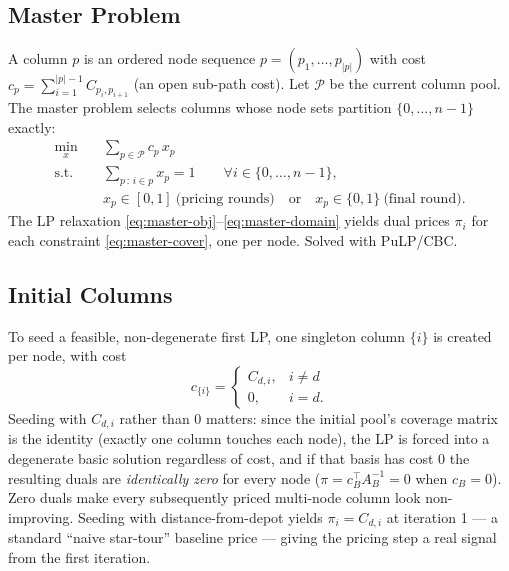 \documentclass[11pt]{article}
\begin{document}
\subsection{Master Problem}
\label{sec:cg-master}

A column $p$ is an ordered node sequence $p = (p_1,\dots,p_{|p|})$ with cost $c_p = \sum_{i=1}^{|p|-1} C_{p_i,p_{i+1}}$ (an open sub-path cost). Let $\mathcal{P}$ be the current column pool. The master problem selects columns whose node sets partition $\{0,\dots,n-1\}$ exactly:
\begin{align}
  \min_{x} \quad & \sum_{p \in \mathcal{P}} c_p\, x_p \label{eq:master-obj}\\
  \text{s.t.} \quad & \sum_{p \,:\, i \in p} x_p = 1 \qquad \forall i \in \{0,\dots,n-1\}, \label{eq:master-cover}\\
  & x_p \in [0,1] \ \text{(pricing rounds)} \quad \text{or} \quad x_p \in \{0,1\} \ \text{(final round)}. \label{eq:master-domain}
\end{align}
The LP relaxation \eqref{eq:master-obj}--\eqref{eq:master-domain} yields dual prices $\pi_i$ for each constraint \eqref{eq:master-cover}, one per node. Solved with PuLP/CBC.

\subsection{Initial Columns}
\label{sec:cg-init}

To seed a feasible, non-degenerate first LP, one singleton column $\{i\}$ is created per node, with cost
\begin{equation}
  c_{\{i\}} = \begin{cases} C_{d,i}, & i \ne d \\ 0, & i = d.\end{cases}
  \label{eq:init-cost}
\end{equation}
Seeding with $C_{d,i}$ rather than $0$ matters: since the initial pool's coverage matrix is the identity (exactly one column touches each node), the LP is forced into a degenerate basic solution regardless of cost, and if that basis has cost $0$ the resulting duals are \emph{identically zero} for every node ($\pi = c_B^\top A_B^{-1} = 0$ when $c_B = 0$). Zero duals make every subsequently priced multi-node column look non-improving. Seeding with distance-from-depot yields $\pi_i = C_{d,i}$ at iteration 1 — a standard ``naive star-tour'' baseline price — giving the pricing step a real signal from the first iteration.
\end{document}
